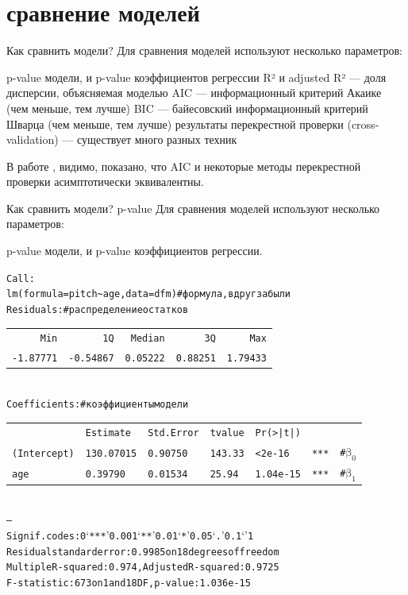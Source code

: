\section{сравнение моделей}
\begin{frame}{Как сравнить модели?}
Для сравнения моделей используют несколько параметров:
\begin{itemize}
\mytem p-value модели, и p-value коэффициентов регрессии
\mytem R² и adjusted R² — доля дисперсии, объясняемая моделью
\mytem AIC — информационный критерий Акаике (чем меньше, тем лучше)
\mytem BIC — байесовский информационный критерий Шварца (чем меньше, тем лучше)
\mytem результаты перекрестной проверки (cross-validation) — существует много разных техник
\end{itemize}
В работе \citep{stone77}, видимо, показано, что AIC и некоторые методы перекрестной проверки асимптотически эквивалентны.
\end{frame}

\begin{frame}{Как сравнить модели? p-value}
Для сравнения моделей используют несколько параметров:
\begin{itemize}
\mytem p-value модели, и p-value коэффициентов регрессии.
\end{itemize}
\scriptsize
\begin{alltt}
Call:\\
lm(formula = pitch \textasciitilde  age, data = dfm)\hfill \# формула, вдруг забыли \bigskip\\
Residuals: \hfill \# распределение остатков\\
\begin{tabular}{rrrrr}
Min & 1Q & Median &3Q & Max \\
-1.87771 & -0.54867 & 0.05222 & 0.88251 & 1.79433 \\
\end{tabular}
\bigskip\\
Coefficients:\hfill \# коэффициенты модели\\
\begin{tabular}{llllllr}
					 	& Estimate		& Std. Error	& t value	&Pr(>|t|)	&  		& \\
(Intercept)		& 130.07015	&   0.90750		&  143.33		&  \alert{< 2e-16} 	& \alert{***} 	& \alert{\# $\mbox{β}_0$}\\
age   				& 0.39790		& 0.01534		& 25.94		& \alert{1.04e-15}	&\alert{***}	&  \alert{\# $\mbox{β}_1$}\\
\end{tabular}
\\
---\\
\alert{Signif. codes:  0 ‘***’ 0.001 ‘**’ 0.01 ‘*’ 0.05 ‘.’ 0.1 ‘ ’ 1}\medskip\\
Residual standard error: 0.9985 on 18 degrees of freedom\\
Multiple R-squared:  0.974,	Adjusted R-squared:  0.9725 \\
F-statistic:   673 on 1 and 18 DF,  \alert{p-value: 1.036e-15}\\
\end{alltt}
\normalsize
\end{frame}

